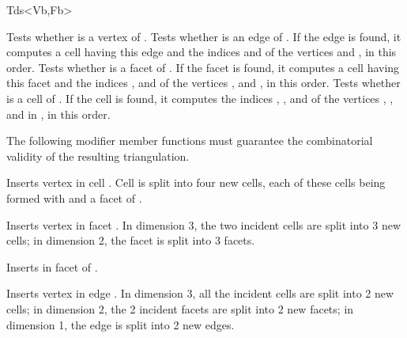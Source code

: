 \begin{ccClassTemplate}{Tds<Vb,Fb>}

{Tests whether  is a vertex of \ccVar.}
\ccGlue
{}
{Tests whether  is an edge of \ccVar. If the edge is found,
it computes a cell  having this edge and the indices 
and  of the vertices  and , in this order.}
\ccGlue
{}
{Tests whether  is a facet of \ccVar. If the facet is found,
it computes a cell  having this facet and the indices ,
 and  of the vertices ,  and , in
this order.} 
\ccGlue
{}
{Tests whether  is a cell of \ccVar. If the cell
 is found, it computes the indices , , 
and  of the vertices , ,  and  in
, in this order.} 

\ccModifiers

The following modifier member functions must guarantee
the combinatorial validity of the resulting triangulation.

{Inserts vertex  in cell . Cell  is split into four
new cells, each of these cells being formed with  and a facet
of .
}

{Inserts vertex  in facet . In dimension 3, the two
incident cells are split into 3 new cells; in dimension 2, the facet is
split into 3 facets.
}

{Inserts  in facet  of .
}

{Inserts vertex  in edge . In dimension 3, all the
incident cells are split into 2 new cells; in dimension 2, the 2
incident facets are split into 2 new facets; in dimension 1, the edge is 
split into 2 new edges.
}


\end{ccClassTemplate}
